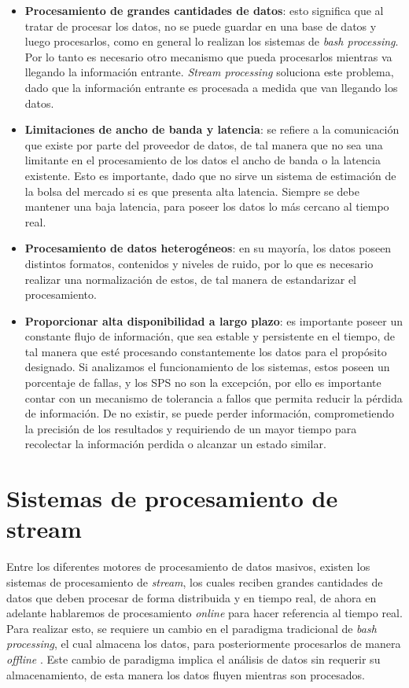 \begin{itemize}
	\item \textbf{Procesamiento de grandes cantidades de datos}: esto significa que al tratar de procesar los datos, no se puede guardar en una base de datos y luego procesarlos, como en general lo realizan los sistemas de \textit{bash processing}. Por lo tanto es necesario otro mecanismo que pueda procesarlos mientras va llegando la informaci\'on entrante. \normalsize{\textit{Stream processing}} soluciona este problema, dado que la informaci\'on entrante es procesada a medida que van llegando los datos.
	\item \textbf{Limitaciones de ancho de banda y latencia}: se refiere a la comunicaci\'on que existe por parte del proveedor de datos, de tal manera que no sea una limitante en el procesamiento de los datos el ancho de banda o la latencia existente. Esto es importante, dado que no sirve un sistema de estimaci\'on de la bolsa del mercado si es que presenta alta latencia. Siempre se debe mantener una baja latencia, para poseer los datos lo m\'as cercano al tiempo real.
	\item \textbf{Procesamiento de datos heterog\'eneos}: en su mayor\'ia, los datos poseen distintos formatos, contenidos y niveles de ruido, por lo que es necesario realizar una normalizaci\'on de estos, de tal manera de estandarizar el procesamiento.
	\item \textbf{Proporcionar alta disponibilidad a largo plazo}: es importante poseer un constante flujo de informaci\'on, que sea estable y persistente en el tiempo, de tal manera que est\'e procesando constantemente los datos para el prop\'osito designado. Si analizamos el funcionamiento de los sistemas, estos poseen un porcentaje de fallas, y los SPS no son la excepci\'on, por ello es importante contar con un mecanismo de tolerancia a fallos que permita reducir la p\'erdida de informaci\'on. De no existir, se puede perder informaci\'on, comprometiendo la precisi\'on de los resultados y requiriendo de un mayor tiempo para recolectar la informaci\'on perdida o alcanzar un estado similar.
\end{itemize}

\section{Sistemas de procesamiento de stream}
\label{sec:SPS}

Entre los diferentes motores de procesamiento de datos masivos, existen los sistemas de procesamiento de \textsl{stream}, los cuales reciben grandes cantidades de datos que deben procesar de forma distribuida y en tiempo real, de ahora en adelante hablaremos de procesamiento \textsl{online} para hacer referencia al tiempo real. Para realizar esto, se requiere un cambio en el paradigma tradicional de \textsl{bash processing}, el cual almacena los datos, para posteriormente procesarlos de manera \textit{offline} \citep{HawwashN14}. Este cambio de paradigma implica el an\'alisis de datos sin requerir su almacenamiento, de esta manera los datos fluyen mientras son procesados.

